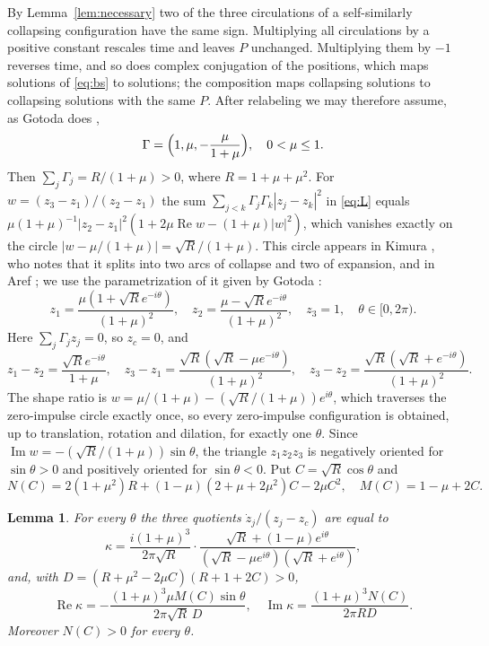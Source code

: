 \documentclass[11pt]{article}
\newtheorem{lemma}{Lemma}
\theoremstyle{definition}
\newcommand{\re}{\operatorname{Re}}
\newcommand{\im}{\operatorname{Im}}
\begin{document}
By Lemma~\ref{lem:necessary} two of the three circulations of a self-similarly collapsing configuration have the same sign. Multiplying all circulations by a positive constant rescales time and leaves $P$ unchanged. Multiplying them by $-1$ reverses time, and so does complex conjugation of the positions, which maps solutions of \eqref{eq:bs} to solutions; the composition maps collapsing solutions to collapsing solutions with the same $P$. After relabeling we may therefore assume, as Gotoda does \cite[Sect.~3]{gotoda2021},
\begin{equation}\label{eq:norm}
  \Gamma = \Bigl(1, \mu, -\frac{\mu}{1 + \mu}\Bigr), \quad 0 < \mu \le 1.
\end{equation}
Then $\sum_j \Gamma_j = R/(1 + \mu) > 0$, where $R = 1 + \mu + \mu^2$. For $w = (z_3 - z_1)/(z_2 - z_1)$ the sum $\sum_{j<k} \Gamma_j \Gamma_k |z_j - z_k|^2$ in \eqref{eq:L} equals $\mu(1 + \mu)^{-1} |z_2 - z_1|^2 (1 + 2\mu \re w - (1 + \mu)|w|^2)$, which vanishes exactly on the circle $|w - \mu/(1 + \mu)| = \sqrt{R}/(1 + \mu)$. This circle appears in Kimura \cite[Eqs.~(3.34)--(3.35)]{kimura1987}, who notes that it splits into two arcs of collapse and two of expansion, and in Aref \cite[Eq.~(20)]{aref2010}; we use the parametrization of it given by Gotoda \cite[Sect.~3]{gotoda2021}:
\begin{equation}\label{eq:pos}
  z_1 = \frac{\mu(1 + \sqrt{R} e^{-i\theta})}{(1 + \mu)^2}, \quad
  z_2 = \frac{\mu - \sqrt{R} e^{-i\theta}}{(1 + \mu)^2}, \quad
  z_3 = 1, \quad \theta \in [0, 2\pi).
\end{equation}
Here $\sum_j \Gamma_j z_j = 0$, so $z_c = 0$, and
\begin{equation}\label{eq:diff}
  z_1 - z_2 = \frac{\sqrt{R} e^{-i\theta}}{1 + \mu}, \quad
  z_3 - z_1 = \frac{\sqrt{R}(\sqrt{R} - \mu e^{-i\theta})}{(1 + \mu)^2}, \quad
  z_3 - z_2 = \frac{\sqrt{R}(\sqrt{R} + e^{-i\theta})}{(1 + \mu)^2}.
\end{equation}
The shape ratio is $w = \mu/(1 + \mu) - (\sqrt{R}/(1 + \mu)) e^{i\theta}$, which traverses the zero-impulse circle exactly once, so every zero-impulse configuration is obtained, up to translation, rotation and dilation, for exactly one $\theta$. Since $\im w = -(\sqrt{R}/(1 + \mu)) \sin\theta$, the triangle $z_1 z_2 z_3$ is negatively oriented for $\sin\theta > 0$ and positively oriented for $\sin\theta < 0$. Put $C = \sqrt{R}\cos\theta$ and
\[
  N(C) = 2(1 + \mu^2) R + (1 - \mu)(2 + \mu + 2\mu^2) C - 2\mu C^2, \quad M(C) = 1 - \mu + 2C.
\]

\begin{lemma}\label{lem:rates}
For every $\theta$ the three quotients $\dot z_j/(z_j - z_c)$ are equal to
\[
  \kappa = \frac{i(1 + \mu)^3}{2\pi\sqrt{R}} \cdot \frac{\sqrt{R} + (1 - \mu) e^{i\theta}}{(\sqrt{R} - \mu e^{i\theta})(\sqrt{R} + e^{i\theta})},
\]
and, with $D = (R + \mu^2 - 2\mu C)(R + 1 + 2C) > 0$,
\[
  \re\kappa = -\frac{(1 + \mu)^3 \mu M(C) \sin\theta}{2\pi\sqrt{R}\, D}, \quad
  \im\kappa = \frac{(1 + \mu)^3 N(C)}{2\pi R D}.
\]
Moreover $N(C) > 0$ for every $\theta$.
\end{lemma}
\end{document}
